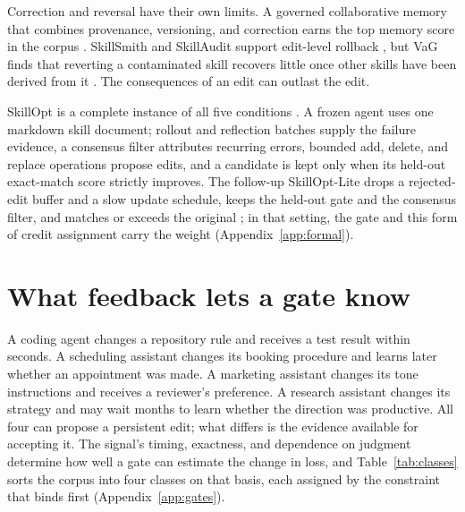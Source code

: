 Correction and reversal have their own limits. A governed collaborative memory that combines provenance, versioning, and correction earns the top memory score in the corpus \citep{cuadros2026governed}. SkillSmith and SkillAudit support edit-level rollback \citep{wei2026skillsmith, gao2026skillaudit}, but VaG finds that reverting a contaminated skill recovers little once other skills have been derived from it \citep{shang2026vag}. The consequences of an edit can outlast the edit.

SkillOpt is a complete instance of all five conditions \citep{yang2026skillopt}. A frozen agent uses one markdown skill document; rollout and reflection batches supply the failure evidence, a consensus filter attributes recurring errors, bounded add, delete, and replace operations propose edits, and a candidate is kept only when its held-out exact-match score strictly improves. The follow-up SkillOpt-Lite drops a rejected-edit buffer and a slow update schedule, keeps the held-out gate and the consensus filter, and matches or exceeds the original \citep{shen2026skilloptlite}; in that setting, the gate and this form of credit assignment carry the weight (Appendix~\ref{app:formal}).

\section{What feedback lets a gate know}\label{sec:signal}

A coding agent changes a repository rule and receives a test result within seconds. A scheduling assistant changes its booking procedure and learns later whether an appointment was made. A marketing assistant changes its tone instructions and receives a reviewer's preference. A research assistant changes its strategy and may wait months to learn whether the direction was productive. All four can propose a persistent edit; what differs is the evidence available for accepting it. The signal's timing, exactness, and dependence on judgment determine how well a gate can estimate the change in loss, and Table~\ref{tab:classes} sorts the corpus into four classes on that basis, each assigned by the constraint that binds first (Appendix~\ref{app:gates}).


